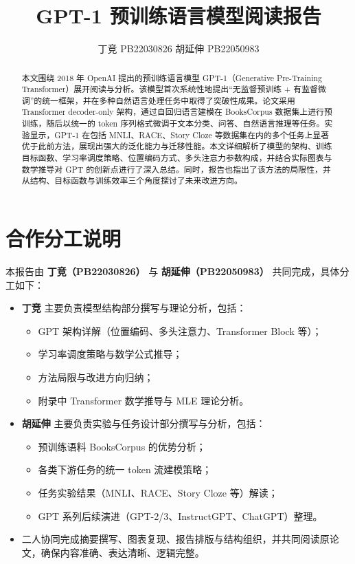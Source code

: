 \documentclass[a4paper,12pt]{article}
\title{GPT-1 预训练语言模型阅读报告}
\author{丁竞 PB22030826 胡延伸 PB22050983}
\date{}
\begin{document}
\maketitle

\section*{合作分工说明}

本报告由 \textbf{丁竞（PB22030826）} 与 \textbf{胡延伸（PB22050983）} 共同完成，具体分工如下：

\begin{itemize}
    \item \textbf{丁竞} 主要负责模型结构部分撰写与理论分析，包括：
    \begin{itemize}
        \item GPT 架构详解（位置编码、多头注意力、Transformer Block 等）；
        \item 学习率调度策略与数学公式推导；
        \item 方法局限与改进方向归纳；
        \item 附录中 Transformer 数学推导与 MLE 理论分析。
    \end{itemize}

    \item \textbf{胡延伸} 主要负责实验与任务设计部分撰写与分析，包括：
    \begin{itemize}
        \item 预训练语料 BooksCorpus 的优势分析；
        \item 各类下游任务的统一 token 流建模策略；
        \item 任务实验结果（MNLI、RACE、Story Cloze 等）解读；
        \item GPT 系列后续演进（GPT-2/3、InstructGPT、ChatGPT）整理。
    \end{itemize}

    \item 二人协同完成摘要撰写、图表复现、报告排版与结构组织，并共同阅读原论文，确保内容准确、表达清晰、逻辑完整。
\end{itemize}

\vspace{1em}


\begin{abstract}
    本文围绕 2018 年 OpenAI 提出的预训练语言模型 GPT-1（Generative Pre-Training Transformer）展开阅读与分析。该模型首次系统性地提出“无监督预训练 + 有监督微调”的统一框架，并在多种自然语言处理任务中取得了突破性成果。论文采用 Transformer decoder-only 架构，通过自回归语言建模在 BooksCorpus 数据集上进行预训练，随后以统一的 token 序列格式微调于文本分类、问答、自然语言推理等任务。实验显示，GPT-1 在包括 MNLI、RACE、Story Cloze 等数据集在内的多个任务上显著优于此前方法，展现出强大的泛化能力与迁移性能。本文详细解析了模型的架构、训练目标函数、学习率调度策略、位置编码方式、多头注意力参数构成，并结合实际图表与数学推导对 GPT 的创新点进行了深入总结。同时，报告也指出了该方法的局限性，并从结构、目标函数与训练效率三个角度探讨了未来改进方向。
    \end{abstract}
    
\end{document}
